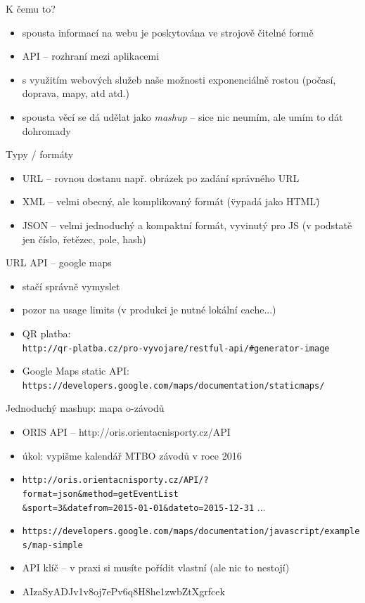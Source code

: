 \documentclass{beamer}
\begin{document}
\begin{frame}{K čemu to?}
  \begin{itemize}
    \item spousta informací na webu je poskytována ve strojově čitelné formě
    \item API -- rozhraní mezi aplikacemi 
    \item s využitím webových služeb naše možnosti exponenciálně rostou (počasí, doprava, mapy, atd atd.)
    \item spousta věcí se dá udělat jako \emph{mashup} -- sice nic neumím, ale umím to dát dohromady
  \end{itemize}
\end{frame}


\begin{frame}{Typy / formáty}
  \begin{itemize}
    \item URL -- rovnou dostanu např. obrázek po zadání správného URL
    \item XML -- velmi obecný, ale komplikovaný formát (\"vypadá jako HTML\")
    \item JSON -- velmi jednoduchý a kompaktní formát, vyvinutý pro JS (v podstatě jen číslo, řetězec, pole, hash)
  \end{itemize}
\end{frame}


\begin{frame}{URL API -- google maps}
  \begin{itemize}
    \item stačí správně vymyslet 
    \item pozor na usage limits (v produkci je nutné lokální cache...) 
    \item QR platba: \\
    {\tiny \texttt{http://qr-platba.cz/pro-vyvojare/restful-api/\#generator-image}}
    \item Google Maps static API: \\
    {\tiny \texttt{https://developers.google.com/maps/documentation/staticmaps/}}
  \end{itemize}
\end{frame}


\begin{frame}{Jednoduchý mashup: mapa o-závodů}
  \begin{itemize}
    \item ORIS API -- http://oris.orientacnisporty.cz/API
    \item úkol: vypišme kalendář MTBO závodů v roce 2016
    \item {\tiny \texttt{http://oris.orientacnisporty.cz/API/?format=json\&method=getEventList \\
    \&sport=3\&datefrom=2015-01-01\&dateto=2015-12-31} ...}
    \item {\tiny \texttt{https://developers.google.com/maps/documentation/javascript/examples/map-simple}}
    \item API klíč -- v praxi si musíte pořídit vlastní (ale nic to nestojí)
    \item AIzaSyADJv1v8oj7ePv6q8H8he1zwbZtXgrfcek
  \end{itemize}
\end{frame}
\end{document}
